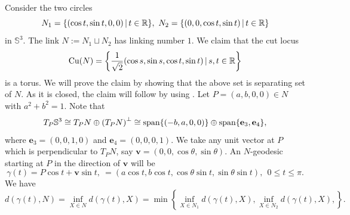 \begin{eg}\label{eg:CutLocusOfLink}
    Consider the two circles
    \begin{displaymath}
        N_1=\{(\cos t,\sin t,0,0)\,|\,t\in\mathbb{R}\},\,\,N_2=\{(0,0,\cos t,\sin t)\,|\,t\in\mathbb{R}\}
    \end{displaymath}
    in $\mathbb{S}^3$. The link $N:=N_1\sqcup N_2$ has linking number $1$. We claim that the cut locus
    \begin{displaymath}
        \mathrm{Cu}(N)=\left\{\frac{1}{\sqrt{2}}(\cos s,\sin s, \cos t,\sin t)\,|\,s,t\in\mathbb{R}\right\}
    \end{displaymath}
    is a torus. We will prove the claim by showing that the above set is separating set of $N$. As it is closed, the claim will follow by using . Let $P=(a,b,0,0)\in N$ with $a^2+b^2=1$. Note that 
    \begin{displaymath}
        T_P\mathbb{S}^3 \cong T_PN\oplus \left(T_PN\right)^\perp \cong \operatorname{span}\{(-b,a,0,0)\} \oplus \operatorname{span} \{\mathbf{e}_3,\mathbf{e}_4\},
    \end{displaymath}  
    where $\mathbf{e}_3=(0,0,1,0)$ and $\mathbf{e}_4=(0,0,0,1)$. We take any unit vector at $P$ which is perpendicular to $T_PN$, say $\mathbf{v}=(0,0,\cos \theta, \sin \theta)$. An $N$-geodesic starting at $P$ in the direction of $\mathbf{v}$ will be
    \begin{displaymath}
        \gamma(t)=P\cos t+\mathbf{v} \sin t,~= (a\cos t,b\cos t,\cos \theta \sin t, \sin \theta \sin t),~ ~0\le t \le \pi.
    \end{displaymath} 
    We have 
    \begin{displaymath}
        d(\gamma(t),N) = \inf_{X\in N}d(\gamma(t),X) = \min\left\{\inf_{X\in N_1}d(\gamma(t),X), \inf_{X\in N_2}d(\gamma(t),X),\right\}.
    \end{displaymath}
    

\end{eg}
